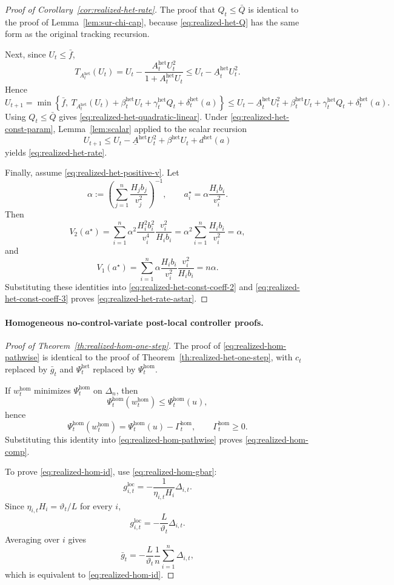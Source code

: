 \documentclass{article}
\theoremstyle{definition}
\begin{document}
\begin{proof}[Proof of Corollary~\ref{cor:realized-het-rate}]
The proof that $Q_t\le \bar Q$ is identical to the proof of Lemma~\ref{lem:sur-chi-cap}, because
\eqref{eq:realized-het-Q} has the same form as the original tracking recursion.

Next, since $U_t\le \bar f$,
\[
T_{A_t^{\mathrm{het}}}(U_t)
=
U_t-\frac{A_t^{\mathrm{het}}U_t^2}{1+A_t^{\mathrm{het}}U_t}
\le
U_t-\underline A_t^{\mathrm{het}}U_t^2.
\]
Hence
\[
U_{t+1}
=
\min\!\left\{
\bar f,\
T_{A_t^{\mathrm{het}}}(U_t)+\beta_t^{\mathrm{het}}U_t+\gamma_t^{\mathrm{het}}Q_t+\delta_t^{\mathrm{het}}(a)
\right\}
\le
U_t-\underline A_t^{\mathrm{het}}U_t^2+\beta_t^{\mathrm{het}}U_t+\gamma_t^{\mathrm{het}}Q_t+\delta_t^{\mathrm{het}}(a).
\]
Using $Q_t\le \bar Q$ gives \eqref{eq:realized-het-quadratic-linear}. Under
\eqref{eq:realized-het-const-param}, Lemma~\ref{lem:scalar} applied to the scalar recursion
\[
U_{t+1}\le U_t-\underline A^{\mathrm{het}}U_t^2+\beta^{\mathrm{het}}U_t+d^{\mathrm{het}}(a)
\]
yields \eqref{eq:realized-het-rate}.

Finally, assume \eqref{eq:realized-het-positive-v}. Let
\[
\alpha:=\left(\sum_{j=1}^n \frac{H_j b_j}{v_j^2}\right)^{-1},
\qquad
a_i^\star=\alpha\frac{H_i b_i}{v_i^2}.
\]
Then
\[
V_2(a^\star)
=
\sum_{i=1}^n \alpha^2 \frac{H_i^2 b_i^2}{v_i^4}\frac{v_i^2}{H_i b_i}
=
\alpha^2 \sum_{i=1}^n \frac{H_i b_i}{v_i^2}
=
\alpha,
\]
and
\[
V_1(a^\star)
=
\sum_{i=1}^n \alpha \frac{H_i b_i}{v_i^2}\frac{v_i^2}{H_i b_i}
=
n\alpha.
\]
Substituting these identities into \eqref{eq:realized-het-const-coeff-2} and
\eqref{eq:realized-het-const-coeff-3} proves \eqref{eq:realized-het-rate-astar}.
\end{proof}
\paragraph{Homogeneous no-control-variate post-local controller proofs.}

\begin{proof}[Proof of Theorem~\ref{th:realized-hom-one-step}]
The proof of \eqref{eq:realized-hom-pathwise} is identical to the proof of
Theorem~\ref{th:realized-het-one-step}, with $c_t$ replaced by $\bar g_t$ and
$\Psi_t^{\mathrm{het}}$ replaced by $\Psi_t^{\mathrm{hom}}$.

If $w_t^{\mathrm{hom}}$ minimizes $\Psi_t^{\mathrm{hom}}$ on $\Delta_n$, then
\[
\Psi_t^{\mathrm{hom}}(w_t^{\mathrm{hom}})\le \Psi_t^{\mathrm{hom}}(u),
\]
hence
\[
\Psi_t^{\mathrm{hom}}(w_t^{\mathrm{hom}})
=
\Psi_t^{\mathrm{hom}}(u)-\Gamma_t^{\mathrm{hom}},
\qquad
\Gamma_t^{\mathrm{hom}}\ge 0.
\]
Substituting this identity into \eqref{eq:realized-hom-pathwise} proves
\eqref{eq:realized-hom-comp}.

To prove \eqref{eq:realized-hom-id}, use \eqref{eq:realized-hom-gbar}:
\[
g_{i,t}^{\mathrm{loc}}
=
-\frac{1}{\eta_{i,t}H_i}\Delta_{i,t}.
\]
Since $\eta_{i,t}H_i=\vartheta_t/L$ for every $i$,
\[
g_{i,t}^{\mathrm{loc}}
=
-\frac{L}{\vartheta_t}\Delta_{i,t}.
\]
Averaging over $i$ gives
\[
\bar g_t
=
-\frac{L}{\vartheta_t}\frac1n\sum_{i=1}^n \Delta_{i,t},
\]
which is equivalent to \eqref{eq:realized-hom-id}.
\end{proof}
\end{document}
